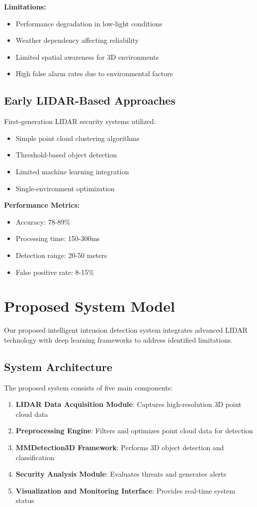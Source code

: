 \documentclass[conference]{IEEEtran}
\begin{document}
\textbf{Limitations:}
\begin{itemize}
\item Performance degradation in low-light conditions
\item Weather dependency affecting reliability
\item Limited spatial awareness for 3D environments
\item High false alarm rates due to environmental factors
\end{itemize}

\subsection{Early LIDAR-Based Approaches}
First-generation LIDAR security systems utilized:
\begin{itemize}
\item Simple point cloud clustering algorithms
\item Threshold-based object detection
\item Limited machine learning integration
\item Single-environment optimization
\end{itemize}

\textbf{Performance Metrics:}
\begin{itemize}
\item Accuracy: 78-89\%
\item Processing time: 150-300ms
\item Detection range: 20-50 meters
\item False positive rate: 8-15\%
\end{itemize}

\section{Proposed System Model}

Our proposed intelligent intrusion detection system integrates advanced LIDAR technology with deep learning frameworks to address identified limitations.

\subsection{System Architecture}
The proposed system consists of five main components:

\begin{enumerate}
\item \textbf{LIDAR Data Acquisition Module}: Captures high-resolution 3D point cloud data
\item \textbf{Preprocessing Engine}: Filters and optimizes point cloud data for detection
\item \textbf{MMDetection3D Framework}: Performs 3D object detection and classification
\item \textbf{Security Analysis Module}: Evaluates threats and generates alerts
\item \textbf{Visualization and Monitoring Interface}: Provides real-time system status
\end{enumerate}
\end{document}
